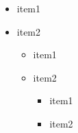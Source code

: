 \begin{itemize}
	\item item1
	\item item2
	\begin{itemize}
		\item item1
		\item item2
		\begin{itemize}
			\item item1
			\item item2
		\end{itemize}
	\end{itemize}
\end{itemize}